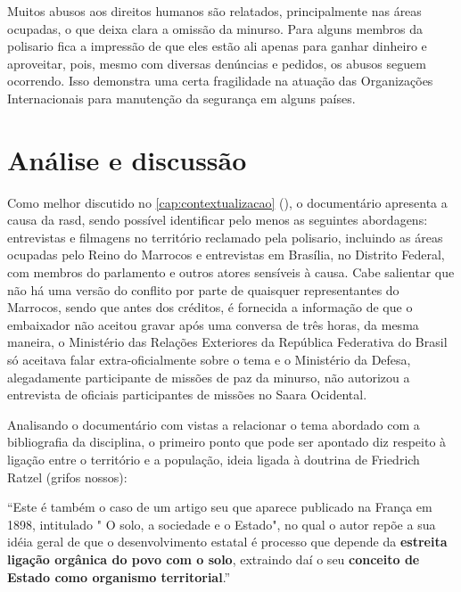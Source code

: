 	Muitos abusos aos direitos humanos são relatados, principalmente nas áreas ocupadas, o que deixa clara a omissão da \gls{minurso}. Para alguns membros da \gls{polisario} fica a impressão de que eles estão ali apenas para ganhar dinheiro e aproveitar, pois, mesmo com diversas denúncias e pedidos, os abusos seguem ocorrendo. Isso demonstra uma certa fragilidade na atuação das Organizações Internacionais para manutenção da segurança em alguns países.
	
	\chapter{Análise e discussão} \label{cap:analise}
	
	Como melhor discutido no \autoref{cap:contextualizacao} (), o documentário apresenta a causa da \glsdesc{rasd}, sendo possível identificar pelo menos as seguintes abordagens: entrevistas e filmagens no território reclamado pela \gls{polisario}, incluindo as áreas ocupadas pelo Reino do Marrocos e entrevistas em Brasília, no Distrito Federal, com membros do parlamento e outros atores sensíveis à causa. Cabe salientar que não há uma versão do conflito por parte de quaisquer representantes do Marrocos, sendo que antes dos créditos, é fornecida a informação de que o embaixador não aceitou gravar após uma conversa de três horas, da mesma maneira, o Ministério das Relações Exteriores da República Federativa do Brasil só aceitava falar extra-oficialmente sobre o tema e o Ministério da Defesa, alegadamente participante de missões de paz da \gls{minurso}, não autorizou a entrevista de oficiais participantes de missões no Saara Ocidental.
	
	
	Analisando o documentário com vistas a relacionar o tema abordado com a bibliografia da disciplina, o primeiro ponto que pode ser apontado diz respeito à ligação entre o território e a população, ideia ligada à doutrina de Friedrich Ratzel (grifos nossos):
	
	\begin{citacao}
		``Este é também o caso de um artigo seu que aparece publicado na França em 1898, intitulado " O solo, a sociedade e o Estado", no qual o autor repõe a sua idéia geral de que o desenvolvimento estatal é processo que depende da \textbf{estreita ligação orgânica do	povo com o solo}, extraindo daí o seu \textbf{conceito de Estado como organismo territorial}.'' \cite[p. 40]{costa1992}
	\end{citacao}
	
